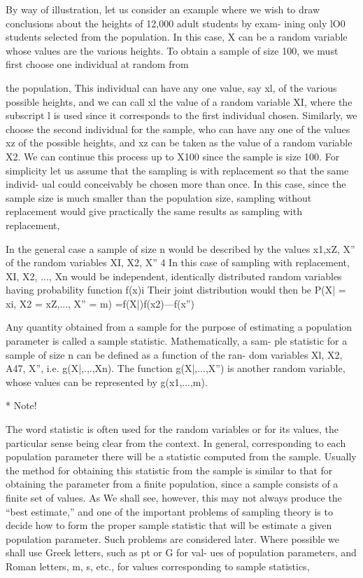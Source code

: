 By way of illustration, let us consider an example where we wish
to draw conclusions about the heights of 12,000 adult students by exam-
ining only lO0 students selected from the population. In this case, X can
be a random variable whose values are the various heights. To obtain a
sample of size 100, we must ﬁrst choose one individual at random from


the population, This individual can have any one value, say xl, of the various possible heights, and we can call xl the value of a random variable XI, where the subscript l is used since it corresponds to the ﬁrst individual chosen. Similarly, we choose the second individual for the sample, who can have any one of the values xz of the possible heights, and xz
can be taken as the value of a random variable X2. We can continue this process up to X100 since the sample is size 100. For simplicity let us assume that the sampling is with replacement so that the same individ-
ual could conceivably be chosen more than once. In this case, since the
sample size is much smaller than the population size, sampling without
replacement would give practically the same results as sampling with
replacement,

In the general case a sample of size n would be described by the
values x1,xZ,  X” of the random variables XI, X2,  X” 4 In this case
of sampling with replacement, XI, X2, ..., Xn would be independent,
identically distributed random variables having probability function
f(x)i Their joint distribution would then be
P(X| = xi, X2 = xZ,..., X” = m) =f(X|)f(x2)---f(x”)

Any quantity obtained from a sample for the purpose of estimating a
population parameter is called a sample statistic. Mathematically, a sam-
ple statistic for a sample of size n can be deﬁned as a function of the ran-
dom variables Xl, X2, A47, X”, i.e. g(X|,.,.,Xn). The function g(X|,...,X”)
is another random variable, whose values can be represented by
g(x1,...,m).

* Note!

The word statistic is often used for the random variables or for its values, the particular sense being clear from the context.
In general, corresponding to each population parameter there will be a statistic computed from the sample. Usually the method for obtaining this statistic from the sample is similar to that for obtaining the
parameter from a ﬁnite population, since a sample consists of a ﬁnite set
of values. As We shall see, however, this may not always produce the
“best estimate,” and one of the important problems of sampling theory
is to decide how to form the proper sample statistic that will be estimate
a given population parameter. Such problems are considered later.
Where possible we shall use Greek letters, such as pt or G for val-
ues of population parameters, and Roman letters, m, s, etc., for values
corresponding to sample statistics,

